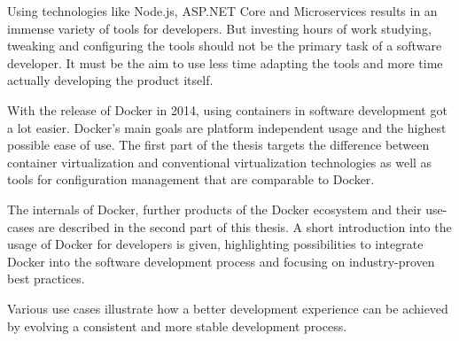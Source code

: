Using technologies like Node.js, ASP.NET Core and Microservices results in an immense variety of tools for developers.
But investing hours of work studying, tweaking and configuring the tools should not be the primary task of a software developer.
It must be the aim to use less time adapting the tools and more time actually developing the product itself.

With the release of Docker in 2014, using containers in software development got a lot easier.
Docker's main goals are platform independent usage and the highest possible ease of use.
The first part of the thesis targets the difference between container virtualization and conventional virtualization technologies as well as tools for configuration management that are comparable to Docker.

The internals of Docker, further products of the Docker ecosystem and their use-cases are described in the second part of this thesis.
A short introduction into the usage of Docker for developers is given, highlighting possibilities to integrate Docker into the software development process and focusing on industry-proven best practices.

Various use cases illustrate how a better development experience can be achieved by evolving a consistent and more stable development process.
